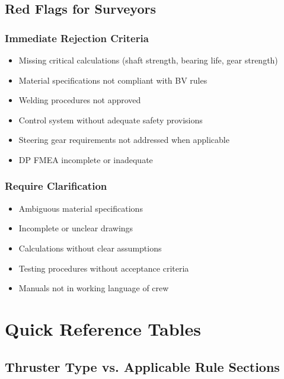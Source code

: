 \documentclass[11pt,a4paper]{report}
\begin{document}
\section{Red Flags for Surveyors}

\subsection{Immediate Rejection Criteria}
\begin{itemize}[leftmargin=*]
\item Missing critical calculations (shaft strength, bearing life, gear strength)
\item Material specifications not compliant with BV rules
\item Welding procedures not approved
\item Control system without adequate safety provisions
\item Steering gear requirements not addressed when applicable
\item DP FMEA incomplete or inadequate
\end{itemize}

\subsection{Require Clarification}
\begin{itemize}[leftmargin=*]
\item Ambiguous material specifications
\item Incomplete or unclear drawings
\item Calculations without clear assumptions
\item Testing procedures without acceptance criteria
\item Manuals not in working language of crew
\end{itemize}

\newpage

\chapter{Quick Reference Tables}
\label{ch:quickref}

\section{Thruster Type vs. Applicable Rule Sections}
\end{document}
